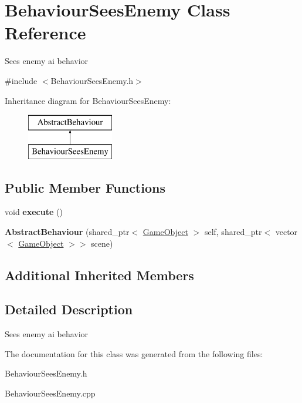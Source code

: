 \hypertarget{class_behaviour_sees_enemy}{}\section{Behaviour\+Sees\+Enemy Class Reference}
\label{class_behaviour_sees_enemy}


Sees enemy ai behavior  




{\ttfamily \#include $<$Behaviour\+Sees\+Enemy.\+h$>$}

Inheritance diagram for Behaviour\+Sees\+Enemy\+:\begin{figure}[H]
\begin{center}
\leavevmode
\includegraphics[height=2.000000cm]{class_behaviour_sees_enemy}
\end{center}
\end{figure}
\subsection*{Public Member Functions}
\begin{DoxyCompactItemize}
\item 
\mbox{\label{class_behaviour_sees_enemy_afddbf2ca7396c9fd7b24f4be60edb84c}} 
void {\bfseries execute} ()
\item 
\mbox{\label{class_behaviour_sees_enemy_a8a3a9217b3179f949a1d6a32f340c00c}} 
{\bfseries Abstract\+Behaviour} (shared\+\_\+ptr$<$ \mbox{\hyperlink{class_game_object}{Game\+Object}} $>$ self, shared\+\_\+ptr$<$ vector$<$ \mbox{\hyperlink{class_game_object}{Game\+Object}} $>$$>$ scene)
\end{DoxyCompactItemize}
\subsection*{Additional Inherited Members}


\subsection{Detailed Description}
Sees enemy ai behavior 



The documentation for this class was generated from the following files\+:\begin{DoxyCompactItemize}
\item 
Behaviour\+Sees\+Enemy.\+h\item 
Behaviour\+Sees\+Enemy.\+cpp\end{DoxyCompactItemize}

